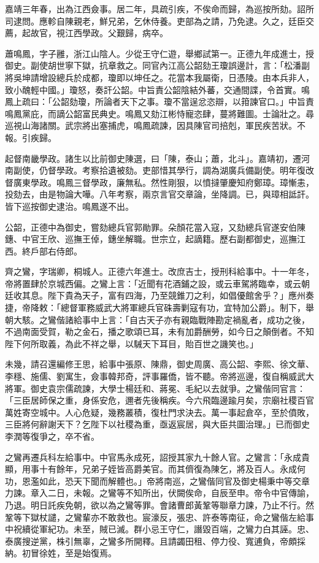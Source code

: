\begin{pinyinscope}
嘉靖三年春，出為江西僉事。居二年，具疏引疾，不俟命而歸，為巡按所劾。詔所司逮問。應軫自陳親老，鮮兄弟，乞休侍養。吏部為之請，乃免逮。久之，廷臣交薦，起故官，視江西學政。父艱歸，病卒。

蕭鳴鳳，字子雝，浙江山陰人。少從王守仁遊，舉鄉試第一。正德九年成進士，授御史。副使胡世寧下獄，抗章救之。同官內江高公韶劾王瓊誤邊計，言：「松潘副將吳坤請增設總兵於成都，瓊即以坤任之。花當本我屬衛，日憑陵。由本兵非人，致小醜輕中國。」瓊怒，奏訐公韶。中旨責公韶陰結外蕃，交通間諜，令首實。鳴鳳上疏曰：「公韶劾瓊，所論者天下之事。瓊不當逞忿恣辯，以箝諫官口。」中旨責鳴鳳黨庇，而謫公韶富民典史。鳴鳳又劾江彬恃寵恣肆，蔓將難圖。士論壯之。尋巡視山海諸關。武宗將出塞捕虎，鳴鳳疏諫，因具陳官司掊剋，軍民疾苦狀。不報。引疾歸。

起督南畿學政。諸生以比前御史陳選，曰「陳，泰山；蕭，北斗」。嘉靖初，遷河南副使，仍督學政。考察拾遺被劾。吏部惜其學行，調為湖廣兵備副使。明年復改督廣東學政。鳴鳳三督學政，廉無私。然性剛狠，以憤撻肇慶知府鄭璋。璋慚恚，投劾去，由是物論大嘩。八年考察，兩京言官交章論，坐降調。已，與璋相詆訐。皆下巡按御史逮治。鳴鳳遂不出。

公韶，正德中為御史，嘗劾總兵官郭勛罪。朵顏花當入寇，又劾總兵官遂安伯陳鏸、中官王欣、巡撫王倬，鏸坐解職。世宗立，起謫籍。歷右副都御史，巡撫江西。終戶部右侍郎。

齊之鸞，字瑞卿，桐城人。正德六年進士。改庶吉士，授刑科給事中。十一年冬，帝將置肆於京城西偏。之鸞上言：「近聞有花酒鋪之設，或云車駕將臨幸，或云朝廷收其息。陛下貴為天子，富有四海，乃至競錐刀之利，如倡優館舍乎？」應州奏捷，帝降敕：「總督軍務威武大將軍總兵官硃壽剿寇有功，宜特加公爵」。制下，舉朝大駭。之鸞偕諸給事中上言：「自古天子亦有親臨戰陣勘定禍亂者，成功之後，不過南面受賀，勒之金石，播之歌頌已耳，未有加爵酬勞，如今日之顛倒者。不知陛下何所取義，為此不祥之舉，以駴天下耳目，貽百世之譏笑也。」

未幾，請召還編修王思，給事中張原、陳鼎，御史周廣、高公韶、李熙、徐文華、李穩、施儒、劉寓生，僉事韓邦奇，評事羅僑，皆不聽。帝將巡邊，復自稱威武大將軍。御史袁宗儒疏諫，大學士楊廷和、蔣冕、毛紀以去就爭。之鸞偕同官言：「三臣居師保之重，身係安危，邇者先後稱疾。今六飛臨邊踰月矣，宗廟社稷百官萬姓寄空城中。人心危疑，幾務叢積，復杜門求決去。萬一事起倉卒，至於僨敗，三臣將何辭謝天下？乞陛下以社稷為重，亟返宸居，與大臣共圖治理。」已而御史李潤等復爭之，卒不省。

之鸞再遷兵科左給事中。中官馬永成死，詔授其家九十餘人官。之鸞言：「永成貴顯，用事十有餘年，兄弟子姪皆高爵美官。而其儕復為陳乞，將及百人。永成何功，恩濫如此，恐天下聞而解體也。」帝將南巡，之鸞偕同官及御史楊秉中等交章力諫。章入二日，未報。之鸞等不知所出，伏闕俟命，自辰至申。帝令中官傳諭，乃退。明日託疾免朝，欲以為之鸞等罪。會諸曹郎黃鞏等聯章力諫，乃止不行。然鞏等下獄杖譴，之鸞輩亦不敢救也。宸濠反，張忠、許泰等南征，命之鸞偕左給事中祝續從軍紀功。未至，賊已滅。群小忌王守仁，譖毀百端，之鸞力白其誣。忠、泰廣搜逆黨，株引無辜，之鸞多所開釋。且請蠲田租、停力役、寬逋負，帝頗採納。初冒徐姓，至是始復焉。


\end{pinyinscope}
